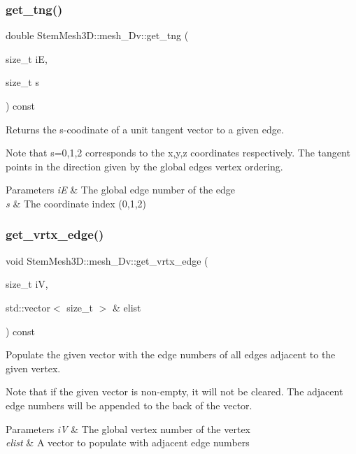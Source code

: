 \subsubsection{\texorpdfstring{get\+\_\+tng()}{get\_tng()}}
{\footnotesize\ttfamily double Stem\+Mesh3\+D\+::mesh\+\_\+Dv\+::get\+\_\+tng (\begin{DoxyParamCaption}\item[{size\+\_\+t}]{iE,  }\item[{size\+\_\+t}]{s }\end{DoxyParamCaption}) const}



Returns the s-\/coodinate of a unit tangent vector to a given edge. 

Note that s=0,1,2 corresponds to the x,y,z coordinates respectively. The tangent points in the direction given by the global edge\textquotesingle{}s vertex ordering. 
\begin{DoxyParams}{Parameters}
{\em iE} & The global edge number of the edge \\
\hline
{\em s} & The coordinate index (0,1,2) \\
\hline
\end{DoxyParams}
\mbox{\label{classStemMesh3D_1_1mesh__3Dv_aa5e678364abe37ff90930374d706cf6f}} 
\subsubsection{\texorpdfstring{get\+\_\+vrtx\+\_\+edge()}{get\_vrtx\_edge()}}
{\footnotesize\ttfamily void Stem\+Mesh3\+D\+::mesh\+\_\+Dv\+::get\+\_\+vrtx\+\_\+edge (\begin{DoxyParamCaption}\item[{size\+\_\+t}]{iV,  }\item[{std\+::vector$<$ size\+\_\+t $>$ \&}]{elist }\end{DoxyParamCaption}) const}



Populate the given vector with the edge numbers of all edges adjacent to the given vertex. 

Note that if the given vector is non-\/empty, it will not be cleared. The adjacent edge numbers will be appended to the back of the vector. 
\begin{DoxyParams}{Parameters}
{\em iV} & The global vertex number of the vertex \\
\hline
{\em elist} & A vector to populate with adjacent edge numbers \\
\hline
\end{DoxyParams}
\mbox{\label{classStemMesh3D_1_1mesh__3Dv_a75a75c96ae9daf80877c60480020667a}} 
